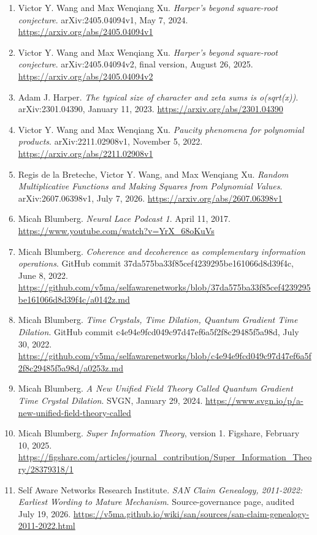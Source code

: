 \documentclass[
  american,
  11pt,
  letterpaper,
]{article}
\providecommand{\tightlist}{%
  \setlength{\itemsep}{0pt}\setlength{\parskip}{0pt}}
\begin{document}
\begin{enumerate}
\def\labelenumi{\arabic{enumi}.}
\tightlist
\item
  Victor Y. Wang and Max Wenqiang Xu. \emph{Harper's beyond square-root conjecture}. arXiv:2405.04094v1, May 7, 2024. \url{https://arxiv.org/abs/2405.04094v1}
\item
  Victor Y. Wang and Max Wenqiang Xu. \emph{Harper's beyond square-root conjecture}. arXiv:2405.04094v2, final version, August 26, 2025. \url{https://arxiv.org/abs/2405.04094v2}
\item
  Adam J. Harper. \emph{The typical size of character and zeta sums is o(sqrt(x))}. arXiv:2301.04390, January 11, 2023. \url{https://arxiv.org/abs/2301.04390}
\item
  Victor Y. Wang and Max Wenqiang Xu. \emph{Paucity phenomena for polynomial products}. arXiv:2211.02908v1, November 5, 2022. \url{https://arxiv.org/abs/2211.02908v1}
\item
  Regis de la Breteche, Victor Y. Wang, and Max Wenqiang Xu. \emph{Random Multiplicative Functions and Making Squares from Polynomial Values}. arXiv:2607.06398v1, July 7, 2026. \url{https://arxiv.org/abs/2607.06398v1}
\item
  Micah Blumberg. \emph{Neural Lace Podcast 1}. April 11, 2017. \url{https://www.youtube.com/watch?v=YrX_68oKuVs}
\item
  Micah Blumberg. \emph{Coherence and decoherence as complementary information operations}. GitHub commit 37da575b\allowbreak{}a33f85ce\allowbreak{}f4239295\allowbreak{}be161066\allowbreak{}d8d39f4c, June 8, 2022. \url{https://github.com/v5ma/selfawarenetworks/blob/37da575ba33f85cef4239295be161066d8d39f4c/a0142z.md}
\item
  Micah Blumberg. \emph{Time Crystals, Time Dilation, Quantum Gradient Time Dilation}. GitHub commit c4e94e9f\allowbreak{}cd049c97\allowbreak{}d47ef6a5\allowbreak{}f2f8c294\allowbreak{}85f5a98d, July 30, 2022. \url{https://github.com/v5ma/selfawarenetworks/blob/c4e94e9fcd049c97d47ef6a5f2f8c29485f5a98d/a0253z.md}
\item
  Micah Blumberg. \emph{A New Unified Field Theory Called Quantum Gradient Time Crystal Dilation}. SVGN, January 29, 2024. \url{https://www.svgn.io/p/a-new-unified-field-theory-called}
\item
  Micah Blumberg. \emph{Super Information Theory}, version 1. Figshare, February 10, 2025. \url{https://figshare.com/articles/journal_contribution/Super_Information_Theory/28379318/1}
\item
  Self Aware Networks Research Institute. \emph{SAN Claim Genealogy, 2011-2022: Earliest Wording to Mature Mechanism}. Source-governance page, audited July 19, 2026. \url{https://v5ma.github.io/wiki/san/sources/san-claim-genealogy-2011-2022.html}
\end{enumerate}
\end{document}
